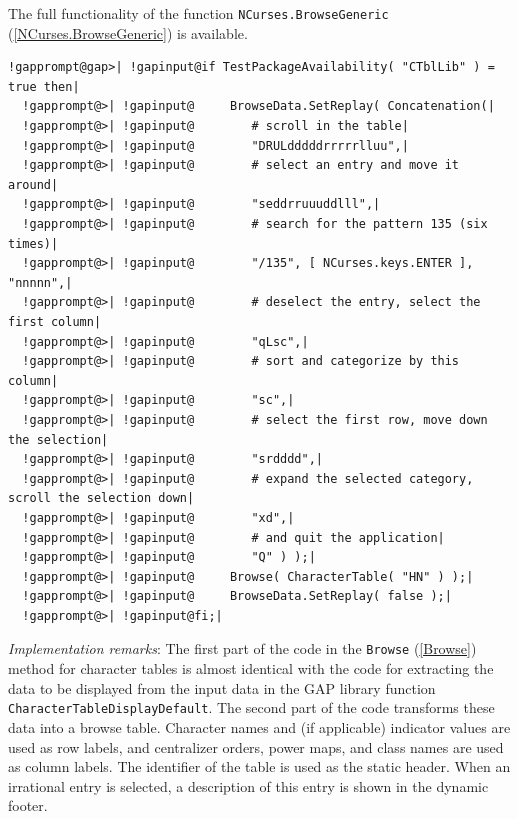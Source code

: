 \documentclass[a4paper,11pt]{report}
\begin{document}
{{{ The full functionality of the function \texttt{NCurses.BrowseGeneric} (\ref{NCurses.BrowseGeneric}) is available. 

 
\begin{Verbatim}[commandchars=!@|,fontsize=\small,frame=single,label=Example]
  !gapprompt@gap>| !gapinput@if TestPackageAvailability( "CTblLib" ) = true then|
  !gapprompt@>| !gapinput@     BrowseData.SetReplay( Concatenation(|
  !gapprompt@>| !gapinput@        # scroll in the table|
  !gapprompt@>| !gapinput@        "DRULdddddrrrrrlluu",|
  !gapprompt@>| !gapinput@        # select an entry and move it around|
  !gapprompt@>| !gapinput@        "seddrruuuddlll",|
  !gapprompt@>| !gapinput@        # search for the pattern 135 (six times)|
  !gapprompt@>| !gapinput@        "/135", [ NCurses.keys.ENTER ], "nnnnn",|
  !gapprompt@>| !gapinput@        # deselect the entry, select the first column|
  !gapprompt@>| !gapinput@        "qLsc",|
  !gapprompt@>| !gapinput@        # sort and categorize by this column|
  !gapprompt@>| !gapinput@        "sc",|
  !gapprompt@>| !gapinput@        # select the first row, move down the selection|
  !gapprompt@>| !gapinput@        "srdddd",|
  !gapprompt@>| !gapinput@        # expand the selected category, scroll the selection down|
  !gapprompt@>| !gapinput@        "xd",|
  !gapprompt@>| !gapinput@        # and quit the application|
  !gapprompt@>| !gapinput@        "Q" ) );|
  !gapprompt@>| !gapinput@     Browse( CharacterTable( "HN" ) );|
  !gapprompt@>| !gapinput@     BrowseData.SetReplay( false );|
  !gapprompt@>| !gapinput@fi;|
\end{Verbatim}
 

 \emph{Implementation remarks}: The first part of the code in the \texttt{Browse} (\ref{Browse}) method for character tables is almost identical with the code for extracting
the data to be displayed from the input data in the \textsf{GAP} library function \texttt{CharacterTableDisplayDefault}. The second part of the code transforms these data into a browse table.
Character names and (if applicable) indicator values are used as row labels,
and centralizer orders, power maps, and class names are used as column labels.
The identifier of the table is used as the static header. When an irrational
entry is selected, a description of this entry is shown in the dynamic footer. 

}}}
\end{document}
